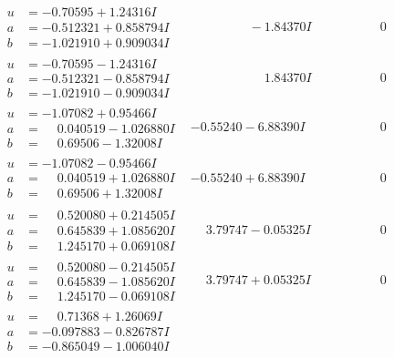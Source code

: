 \documentclass[1p]{elsarticle_modified}
\theoremstyle{definition}
\begin{document}
$$\begin{array}{c|c|c}
\begin{aligned}
u &= -0.70595 + 1.24316 I \\
a &= -0.512321 + 0.858794 I \\
b &= -1.021910 + 0.909034 I\end{aligned}
 & \phantom{-0.000000 } -1.84370 I & \phantom{-0.000000 } 0 \\ \hline\begin{aligned}
u &= -0.70595 - 1.24316 I \\
a &= -0.512321 - 0.858794 I \\
b &= -1.021910 - 0.909034 I\end{aligned}
 & \phantom{-0.000000 -}1.84370 I & \phantom{-0.000000 } 0 \\ \hline\begin{aligned}
u &= -1.07082 + 0.95466 I \\
a &= \phantom{-}0.040519 - 1.026880 I \\
b &= \phantom{-}0.69506 - 1.32008 I\end{aligned}
 & -0.55240 - 6.88390 I & \phantom{-0.000000 } 0 \\ \hline\begin{aligned}
u &= -1.07082 - 0.95466 I \\
a &= \phantom{-}0.040519 + 1.026880 I \\
b &= \phantom{-}0.69506 + 1.32008 I\end{aligned}
 & -0.55240 + 6.88390 I & \phantom{-0.000000 } 0 \\ \hline\begin{aligned}
u &= \phantom{-}0.520080 + 0.214505 I \\
a &= \phantom{-}0.645839 + 1.085620 I \\
b &= \phantom{-}1.245170 + 0.069108 I\end{aligned}
 & \phantom{-}3.79747 - 0.05325 I & \phantom{-0.000000 } 0 \\ \hline\begin{aligned}
u &= \phantom{-}0.520080 - 0.214505 I \\
a &= \phantom{-}0.645839 - 1.085620 I \\
b &= \phantom{-}1.245170 - 0.069108 I\end{aligned}
 & \phantom{-}3.79747 + 0.05325 I & \phantom{-0.000000 } 0 \\ \hline\begin{aligned}
u &= \phantom{-}0.71368 + 1.26069 I \\
a &= -0.097883 - 0.826787 I \\
b &= -0.865049 - 1.006040 I\end{aligned}

\end{array}$$
\end{document}
